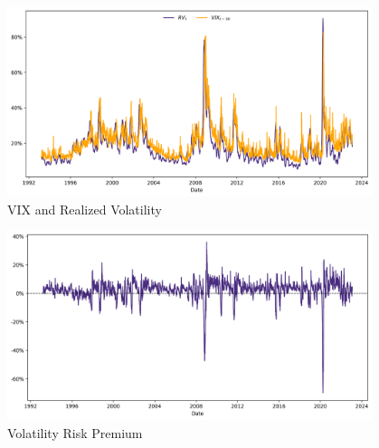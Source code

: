 \documentclass[12pt,twoside]{article}
\begin{document}
\begin{enumerate}[label = \arabic*)]
\begin{solution}
        \begin{figure}[!htbp]
            \begin{small}
                \begin{center}
                    \includegraphics[width=0.95\textwidth]{images/rv_and_vix.png}
                \end{center}
                \caption{VIX and Realized Volatility}
                \label{fig:rv_and_vix}
            \end{small}
        \end{figure}

        \begin{figure}[!htbp]
            \begin{small}
                \begin{center}
                    \includegraphics[width=0.95\textwidth]{images/vol_premium.png}
                \end{center}
                \caption{Volatility Risk Premium}
                \label{fig:}
            \end{small}
        \end{figure}
    \end{solution}
\end{enumerate}

\newpage
$ $\clearpage


\end{document}
